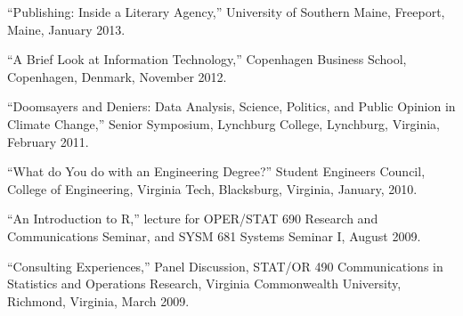 \documentclass[11pt,article,oneside]{memoir}
\begin{document}









 
 \bigskip

\medskip

\ind “Publishing: Inside a Literary Agency,” University of Southern Maine, Freeport, Maine, January 2013.

\ind “A Brief Look at Information Technology,” Copenhagen Business School, Copenhagen, Denmark, November 2012.

\ind “Doomsayers and Deniers: Data Analysis, Science, Politics, and Public Opinion in Climate Change,” Senior Symposium, Lynchburg College, Lynchburg, Virginia, February 2011.

\ind “What do You do with an Engineering Degree?” Student Engineers Council, College of Engineering, Virginia Tech, Blacksburg, Virginia, January, 2010.

\ind “An Introduction to R,” lecture for OPER/STAT 690 Research and Communications Seminar, and SYSM 681 Systems Seminar I, August 2009.

\ind “Consulting Experiences,” Panel Discussion, STAT/OR 490 Communications in Statistics and Operations Research, Virginia Commonwealth University, Richmond, Virginia, March 2009.
\end{document}
